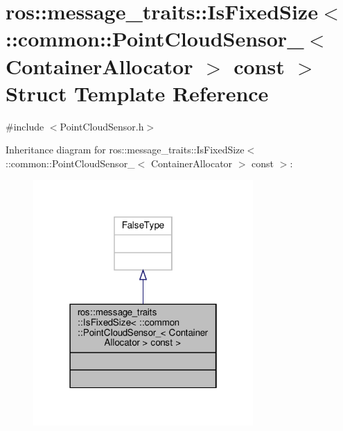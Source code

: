 \hypertarget{structros_1_1message__traits_1_1IsFixedSize_3_01_1_1common_1_1PointCloudSensor___3_01ContainerAllocator_01_4_01const_01_4}{}\section{ros\+:\+:message\+\_\+traits\+:\+:Is\+Fixed\+Size$<$ \+:\+:common\+:\+:Point\+Cloud\+Sensor\+\_\+$<$ Container\+Allocator $>$ const $>$ Struct Template Reference}
\label{structros_1_1message__traits_1_1IsFixedSize_3_01_1_1common_1_1PointCloudSensor___3_01ContainerAllocator_01_4_01const_01_4}


{\ttfamily \#include $<$Point\+Cloud\+Sensor.\+h$>$}



Inheritance diagram for ros\+:\+:message\+\_\+traits\+:\+:Is\+Fixed\+Size$<$ \+:\+:common\+:\+:Point\+Cloud\+Sensor\+\_\+$<$ Container\+Allocator $>$ const $>$\+:\nopagebreak
\begin{figure}[H]
\begin{center}
\leavevmode
\includegraphics[width=238pt]{db/dcb/structros_1_1message__traits_1_1IsFixedSize_3_01_1_1common_1_1PointCloudSensor___3_01ContainerAl771e446e8bd8e63cdb830dc22c6e2ccb}
\end{center}
\end{figure}


